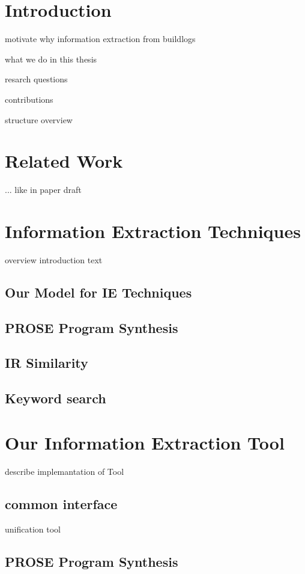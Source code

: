 \documentclass[\myrootdir/main.tex]{subfiles}
\begin{document}
\chapter{Introduction}
motivate why information extraction from buildlogs

what we do in this thesis

resarch questions

contributions

structure overview

\chapter{Related Work}
... like in paper draft

\chapter{Information Extraction Techniques}
overview introduction text

\section{Our Model for IE Techniques}

\section{PROSE Program Synthesis}

\section{IR Similarity}

\section{Keyword search}

\chapter{Our Information Extraction Tool}
describe implemantation of Tool

\section{common interface} 
unification tool

\section{PROSE Program Synthesis}
\end{document}
